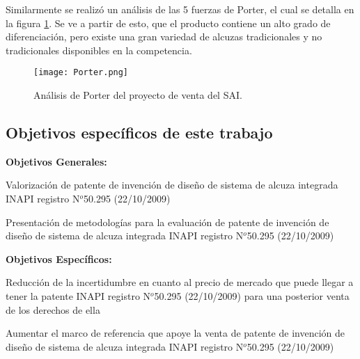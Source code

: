 Similarmente se realizó un análisis de las 5 fuerzas de Porter, el cual se detalla en la figura \ref{porter1}. Se ve a partir de esto, que el producto contiene un alto grado de diferenciación, pero existe una gran variedad de alcuzas tradicionales y no tradicionales disponibles en la competencia.

\begin{figure}[H]
  \texttt{[image: Porter.png]}
  \caption{Análisis de Porter del proyecto de venta del SAI.}
  \label{porter1}
\end{figure}

\subsection{Objetivos específicos de este trabajo}
\textbf{Objetivos Generales:}

Valorización de patente de invención de diseño de sistema de alcuza integrada INAPI registro N$^o$50.295 (22/10/2009)

Presentación de metodologías para la evaluación de patente de invención de diseño de sistema de alcuza integrada INAPI registro N$^o$50.295 (22/10/2009)



\textbf{Objetivos Específicos:}

Reducción de la incertidumbre en cuanto al precio de mercado que puede llegar a tener la patente INAPI  registro N$^o$50.295 (22/10/2009) para una posterior venta de los derechos de ella

Aumentar el marco de referencia que apoye la venta de patente de invención de diseño de sistema de alcuza integrada INAPI registro N$^o$50.295 (22/10/2009)
